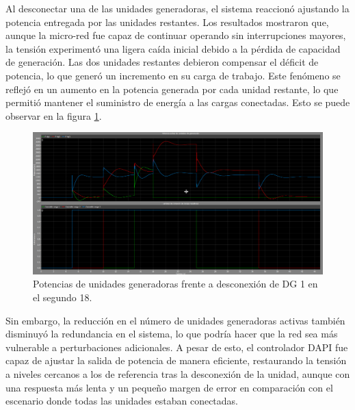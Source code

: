 
Al desconectar una de las unidades generadoras, el sistema reaccionó ajustando la potencia entregada por las unidades restantes. Los resultados mostraron que, aunque la micro-red fue capaz de continuar operando sin interrupciones mayores, la tensión experimentó una ligera caída inicial debido a la pérdida de capacidad de generación. Las dos unidades restantes debieron compensar el déficit de potencia, lo que generó un incremento en su carga de trabajo. Este fenómeno se reflejó en un aumento en la potencia generada por cada unidad restante, lo que permitió mantener el suministro de energía a las cargas conectadas. Esto se puede observar en la figura \ref{desconexion_dg}.\\


\begin{figure}
    \centering
    \includegraphics[width=0.5\linewidth]{Tarea 2/report/imagenes/p3c/desconexion_dg.png}
    \caption{Potencias de unidades generadoras frente a desconexión de DG 1 en el segundo 18.}
    \label{desconexion_dg}
\end{figure}

Sin embargo, la reducción en el número de unidades generadoras activas también disminuyó la redundancia en el sistema, lo que podría hacer que la red sea más vulnerable a perturbaciones adicionales. A pesar de esto, el controlador DAPI fue capaz de ajustar la salida de potencia de manera eficiente, restaurando la tensión a niveles cercanos a los de referencia tras la desconexión de la unidad, aunque con una respuesta más lenta y un pequeño margen de error en comparación con el escenario donde todas las unidades estaban conectadas.